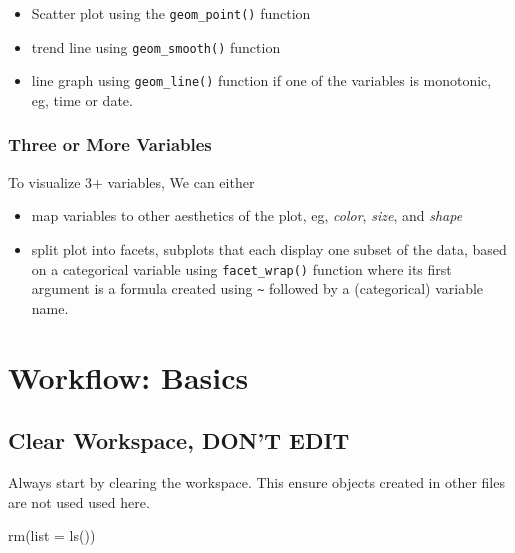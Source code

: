 \documentclass[
  letterpaper,
  DIV=11,
  numbers=noendperiod]{scrreprt}
\newenvironment{Shaded}{\begin{snugshade}}{\end{snugshade}}
\newcommand{\AttributeTok}[1]{\textcolor[rgb]{0.40,0.45,0.13}{#1}}
\newcommand{\FunctionTok}[1]{\textcolor[rgb]{0.28,0.35,0.67}{#1}}
\newcommand{\NormalTok}[1]{\textcolor[rgb]{0.00,0.23,0.31}{#1}}
\providecommand{\tightlist}{%
  \setlength{\itemsep}{0pt}\setlength{\parskip}{0pt}}\usepackage{longtable,booktabs,array}
\begin{document}
\begin{itemize}
\tightlist
\item
  Scatter plot using the \texttt{geom\_point()} function
\item
  trend line using \texttt{geom\_smooth()} function
\item
  line graph using \texttt{geom\_line()} function if one of the
  variables is monotonic, eg, time or date.
\end{itemize}

\subsection{Three or More Variables}\label{three-or-more-variables}

To visualize 3+ variables, We can either

\begin{itemize}
\tightlist
\item
  map variables to other aesthetics of the plot, eg, \emph{color},
  \emph{size}, and \emph{shape}
\item
  split plot into facets, subplots that each display one subset of the
  data, based on a categorical variable using \texttt{facet\_wrap()}
  function where its first argument is a formula created using
  \texttt{\textasciitilde{}} followed by a (categorical) variable name.
\end{itemize}

\chapter{Workflow: Basics}\label{workflow-basics}

\section*{Clear Workspace, DON'T
EDIT}\label{clear-workspace-dont-edit-3}


Always start by clearing the workspace. This ensure objects created in
other files are not used used here.

\begin{Shaded}
\begin{Highlighting}[]
\FunctionTok{rm}\NormalTok{(}\AttributeTok{list =} \FunctionTok{ls}\NormalTok{())}
\end{Highlighting}
\end{Shaded}
\end{document}

